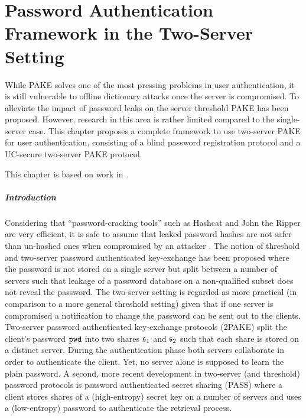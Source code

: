 \chapter{Password Authentication Framework in the Two-Server Setting} \label{ch:2pake}

While \ac{PAKE} solves one of the most pressing problems in user authentication, it is still vulnerable to offline dictionary attacks once the server is compromised.
To alleviate the impact of password leaks on the server threshold \ac{PAKE} has been proposed.
However, research in this area is rather limited compared to the single-server case.
This chapter proposes a complete framework to use two-server \ac{PAKE} for user authentication, consisting of a blind password registration protocol and a \ac{UC}-secure two-server \ac{PAKE} protocol.

This chapter is based on work in \cite{KieferM14b,KieferM15b,KieferM15c}.

\paragraph{Introduction}

Considering that ``password-cracking tools'' such as Hashcat \cite{hashcat} and John the Ripper \cite{JohnTheRipper} are very efficient, it is safe to assume that leaked password hashes are not safer than un-hashed ones when compromised by an attacker \cite{NarayananS05a,WeirAMG09,DellAmicoMR10,Bonneau12}.
The notion of threshold and two-server password authenticated key-exchange \cite{FordK00,MacKenzieSJ02} has been proposed where the password is not stored on a single server but split between a number of servers such that leakage of a password database on a non-qualified subset does not reveal the password.
The two-server setting is regarded as more practical (in comparison to a more general threshold setting) given that if one server is compromised a notification to change the password can be sent out to the clients.
Two-server password authenticated key-exchange protocols (2PAKE) \cite{Brainard2003,SzydloK05,Katz2005} split the client's password $\mathtt{pwd}$ into two shares $\mathfrak{s}_1$ and $\mathfrak{s}_2$ such that each share is stored on a distinct server.
During the authentication phase both servers collaborate in order to authenticate the client.
Yet, no server alone is supposed to learn the plain password.
A second, more recent development in two-server (and threshold) password protocols is password authenticated secret sharing (PASS) \cite{Bagherzandi2011,CamenischLN2012,JareckiKK14} where a client stores shares of a (high-entropy) secret key on a number of servers and uses a (low-entropy) password to authenticate the retrieval process.

